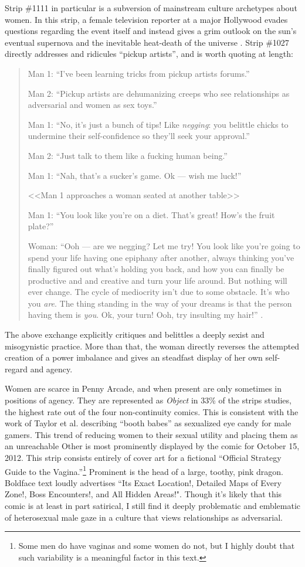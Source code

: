 \documentclass[man,12pt]{apa6}
\begin{document}
Strip \#1111 in particular is a subversion of mainstream culture archetypes about women. In this strip, a female television reporter at a major Hollywood evades questions regarding the event itself and instead gives a grim outlook on the sun's eventual supernova and the inevitable heat-death of the universe \cite{xkcd}. Strip \#1027 directly addresses and ridicules ``pickup artists'', and is worth quoting at length:
\begin{quote}
Man 1: ``I've been learning tricks from pickup artists forums.''

Man 2: ``Pickup artists are dehumanizing creeps who see relationships as adversarial and women as sex toys.''

Man 1: ``No, it's just a bunch of tips! Like \emph{negging}: you belittle chicks to undermine their self-confidence so they'll seek your approval.''

Man 2: ``Just talk to them like a fucking human being.''

Man 1: ``Nah, that's a sucker's game. Ok --- wish me luck!''

<<Man 1 approaches a woman seated at another table>>

Man 1: ``You look like you're on a diet. That's great! How's the fruit plate?''

Woman: ``Ooh --- are we negging? Let me try! You look like you're going to spend your life having one epiphany after another, always thinking you've finally figured out what's holding you back, and how you can finally be productive and and creative and turn your life around. But nothing will ever change. The cycle of mediocrity isn't due to some obstacle. It's who you \emph{are}. The thing standing in the way of your dreams is that the person having them is \emph{you}. Ok, your turn! Ooh, try insulting my hair!''
\cite{xkcd}.
\end{quote}
The above exchange explicitly critiques and belittles a deeply sexist and misogynistic practice. More than that, the woman directly reverses the attempted creation of a power imbalance and gives an steadfast display of her own self-regard and agency.

 Women are scarce in Penny Arcade, and when present are only sometimes in positions of agency. They are represented as \emph{Object} in 33\% of the strips studies, the highest rate out of the four non-continuity comics. This is consistent with the work of Taylor et al. describing ``booth babes'' as sexualized eye candy for male gamers. This trend of reducing women to their sexual utility and placing them as an unreachable Other is most prominently displayed by the comic for October 15, 2012. This strip consists entirely of cover art for a fictional ``Official Strategy Guide to the Vagina.''\footnote{Some men do have vaginas and some women do not, but I highly doubt that such variability is a meaningful factor in this text.} Prominent is the head of a large, toothy, pink dragon. Boldface text loudly advertises ``Its Exact Location!, Detailed Maps of Every Zone!, Boss Encounters!, and All Hidden Areas!"\cite{pa}. Though it's likely that this comic is at least in part satirical, I still find it deeply problematic and emblematic of heterosexual male gaze in a culture that views relationships as adversarial. 
\end{document}
